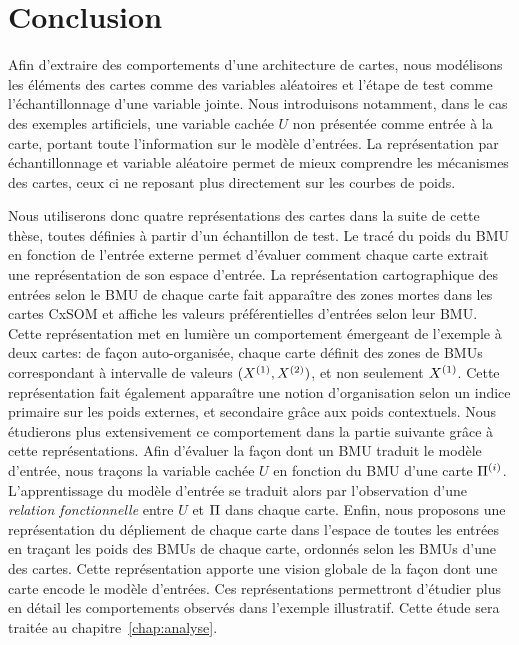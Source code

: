 \documentclass[../main]{subfiles}
\begin{document}
\section{Conclusion}

Afin d'extraire des comportements d'une architecture de cartes, nous modélisons les éléments des cartes comme des variables aléatoires et l'étape de test comme l'échantillonnage d'une variable jointe. Nous introduisons notamment, dans le cas des exemples artificiels, une variable cachée $U$ non présentée comme entrée à la carte, portant toute l'information sur le modèle d'entrées.
La représentation par échantillonnage et variable aléatoire permet de mieux comprendre les mécanismes des cartes, ceux ci ne reposant plus directement sur les courbes de poids.

Nous utiliserons donc quatre représentations des cartes dans la suite de cette thèse, toutes définies à partir d'un échantillon de test.
Le tracé du poids du BMU en fonction de l'entrée externe permet d'évaluer comment chaque carte extrait une représentation de son espace d'entrée.
La représentation cartographique des entrées selon le BMU de chaque carte fait apparaître des zones mortes dans les cartes CxSOM et affiche les valeurs préférentielles d'entrées selon leur BMU. Cette représentation met en lumière un comportement émergeant de l'exemple à deux cartes: de façon auto-organisée, chaque carte définit des zones de BMUs correspondant à intervalle de valeurs $(X^{({1})},X^{({2})})$, et non seulement $X^{({1})}$. Cette représentation fait également apparaître une notion d'organisation selon un indice primaire sur les poids externes, et secondaire grâce aux poids contextuels. Nous étudierons plus extensivement ce comportement dans la partie suivante grâce à cette représentations.
Afin d'évaluer la façon dont un BMU traduit le modèle d'entrée, nous traçons la variable cachée $U$ en fonction du BMU d'une carte $\Pi^{({i})}$.
L'apprentissage du modèle d'entrée se traduit alors par l'observation d'une \emph{relation fonctionnelle} entre $U$ et $\Pi$ dans chaque carte.
Enfin, nous proposons une représentation du dépliement de chaque carte dans l'espace de toutes les entrées en traçant les poids des BMUs de chaque carte, ordonnés selon les BMUs d'une des cartes. Cette représentation apporte une vision globale de la façon dont une carte encode le modèle d'entrées.
Ces représentations permettront d'étudier plus en détail les comportements observés dans l'exemple illustratif. Cette étude sera traitée au chapitre~\ref{chap:analyse}.
\end{document}
